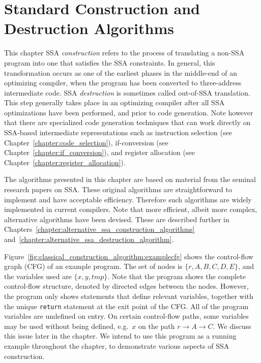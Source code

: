 \chapter{Standard Construction and Destruction Algorithms }
\label{chapter:classical_construction_algorithm}


{ 

  This chapter %
  SSA \emph{construction} refers to the process of translating a non-SSA program into one that satisfies the SSA constraints. 
  In general, this transformation occurs as one of the earliest phases in the middle-end of an optimizing compiler, when the program has been converted to three-address intermediate code. 
  SSA \emph{destruction} is sometimes called out-of-SSA translation. 
  This step generally takes place in an optimizing compiler after all SSA optimizations have been performed, and prior to code generation. 
  Note however that there are specialized code generation techniques that can work directly on SSA-based intermediate representations such as instruction selection \ifcodeselectin (see Chapter~\ref{chapter:code_selection})\fi, if-conversion (see Chapter~\ref{chapter:if_conversion}), and register allocation \ifregin (see Chapter~\ref{chapter:register_allocation})\fi.

  The algorithms presented in this chapter are based on material from the seminal research papers on SSA. 
  These original algorithms are straightforward to implement and have acceptable efficiency. 
  Therefore such algorithms are widely implemented in current compilers. 
  Note that more efficient, albeit more complex, alternative algorithms have been devised. 
  These are described further in Chapters~\ref{chapter:alternative_ssa_construction_algorithms} and~\ref{chapter:alternative_ssa_destruction_algorithm}.

  Figure~\ref{fig:classical_construction_algorithm:examplecfg} shows the control-flow graph (CFG) of an example program. 
  The set of nodes is $\{ r, A, B, C, D, E\}$, and the variables used are $\{ x, y, \textit{tmp} \}$. 
  Note that the program shows the complete control-flow structure, denoted by directed edges between the nodes. 
  However, the program only shows statements that define relevant variables, together with the unique \texttt{return} statement at the exit point of the CFG. 
  All of the program variables are undefined on entry. 
  On certain control-flow paths, some variables may be used without being defined, e.g.\ $x$ on the path $r \rightarrow A \rightarrow C$. 
  We discuss this issue later in the chapter. 
  We intend to use this program as a running example throughout the chapter, to demonstrate various aspects of SSA construction.


}
